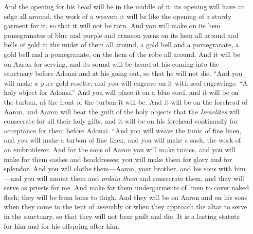 \begin{biblechapter}
\verse And the opening for his head will be in the middle of it; its opening will have an edge all around, the work of a weaver; it will be like the opening of a sturdy garment for it, so that it will not be torn.
\verse And you will make on its hem pomegranates of blue and purple and crimson yarns on its hem all around and bells of gold in the midst of them all around,
\verse a gold bell and a pomegranate, a gold bell and a pomegranate, on the hem of the robe all around.
\verse And it will be on Aaron for serving, and its sound will be heard at his coming into the sanctuary before Adonai and at his going out, so that he will not die.
\verse “And you will make a pure gold rosette, and you will engrave on it with seal engravings: “A holy object for Adonai.”
\verse And you will place it on a blue cord, and it will be on the turban, at the front of the turban it will be.
\verse And it will be on the forehead of Aaron, and Aaron will bear the guilt of the holy objects that the \textit{Israelites} will consecrate for all their holy gifts, and it will be on his forehead continually for acceptance for them before Adonai.
\verse “And you will weave the tunic of fine linen, and you will make a turban of fine linen, and you will make a sash, the work of an embroiderer.
\verse And for the sons of Aaron you will make tunics, and you will make for them sashes and headdresses; you will make them for glory and for splendor.
\verse And you will clothe them—Aaron, your brother, and his sons with him—and you will anoint them and \textit{ordain them} and consecrate them, and they will serve as priests for me.
\verse And make for them undergarments of linen to cover naked flesh; they will be from loins to thigh.
\verse And they will be on Aaron and on his sons when they come to the tent of assembly or when they approach the altar to serve in the sanctuary, so that they will not bear guilt and die. It is a lasting statute for him and for his offspring after him.
\end{biblechapter}

